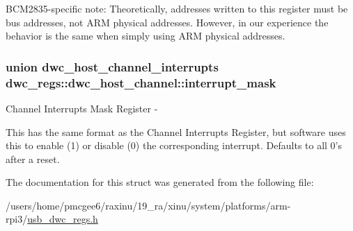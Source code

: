 B\-C\-M2835-\/specific note\-: Theoretically, addresses written to this register must be bus addresses, not A\-R\-M physical addresses. However, in our experience the behavior is the same when simply using A\-R\-M physical addresses. \hypertarget{structdwc__regs_1_1dwc__host__channel_a78409680286365a55da4dce096730c4b}{
\subsubsection[{interrupt\-\_\-mask}]{\setlength{\rightskip}{0pt plus 5cm}union {\bf dwc\-\_\-host\-\_\-channel\-\_\-interrupts} dwc\-\_\-regs\-::dwc\-\_\-host\-\_\-channel\-::interrupt\-\_\-mask}}\label{structdwc__regs_1_1dwc__host__channel_a78409680286365a55da4dce096730c4b}
Channel Interrupts Mask Register -\/

This has the same format as the Channel Interrupts Register, but software uses this to enable (1) or disable (0) the corresponding interrupt. Defaults to all 0's after a reset. 

The documentation for this struct was generated from the following file\-:\begin{DoxyCompactItemize}
\item 
/users/home/pmcgee6/raxinu/19\-\_\-ra/xinu/system/platforms/arm-\/rpi3/\hyperlink{usb__dwc__regs_8h}{usb\-\_\-dwc\-\_\-regs.\-h}\end{DoxyCompactItemize}
